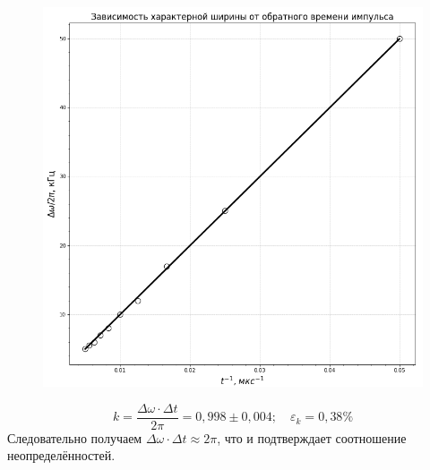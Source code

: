 \documentclass[a4paper,12pt]{article}
\begin{document}
\newpage
\begin{figure}[H]\label{fig: Delta_nu(1 / tau)}
    \centering
    \includegraphics[width = \textwidth]{Delta_nu(tau pow-1).png}
\end{figure}
\[k = \frac{\Delta \omega \cdot \Delta t}{2 \pi} = 0,998 \pm 0,004; \quad \varepsilon_k = 0,38\%\]
Следовательно получаем $\Delta \omega \cdot \Delta t \approx 2 \pi$, что и подтверждает соотношение неопределённостей.
\end{document}
